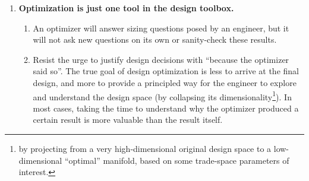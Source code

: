 \begin{enumerate}
\begin{enumerate}
    \end{enumerate}
    \item \textbf{Optimization is just one tool in the design toolbox.}
    \begin{enumerate}
        \item An optimizer will answer sizing questions posed by an engineer, but it will not ask new questions on its own or sanity-check these results.
        \item Resist the urge to justify design decisions with ``because the optimizer said so''. The true goal of design optimization is less to arrive at the final design, and more to provide a principled way for the engineer to explore and understand the design space (by collapsing its dimensionality\footnote{by projecting from a very high-dimensional original design space to a low-dimensional ``optimal'' manifold, based on some trade-space parameters of interest.}). In most cases, taking the time to understand why the optimizer produced a certain result is more valuable than the result itself.
    \end{enumerate}
\end{enumerate}